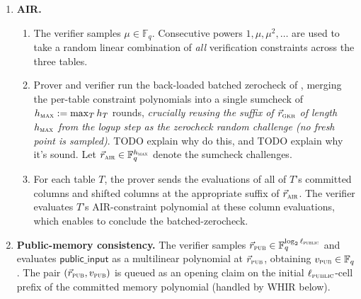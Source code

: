 \documentclass{article}
\theoremstyle{definition}
\newcommand{\Fq}{\mathbb F_q}
\begin{document}
\begin{enumerate}
\begin{enumerate}
         \item The prover sends, at the appropriate suffixes of $\vec r_\textsc{gkr}$:
    \begin{itemize}
        \item the evaluations of $\textsf{memory\_acc}$ and $\textbf{m}$ for the memory section;
        \item the evaluation of $\textsf{bytecode\_acc}$ for the bytecode section;
        \item for each table $T$ and each bus interaction of $T$, the per-column evaluations needed to reconstruct that bus's numerator/denominator contribution.
    \end{itemize}
    The verifier recombines these evaluations into a claimed total numerator and denominator and checks they equal $(e_\text{num}, e_\text{den})$.
    \end{enumerate}

    \item \textbf{AIR.}
    \begin{enumerate}
        \item The verifier samples $\mu \in \Fq$. Consecutive powers $1, \mu, \mu^2, \dots$ are used to take a random linear combination of \emph{all} verification constraints across the three tables.
        \item Prover and verifier run the back-loaded batched zerocheck of , merging the per-table constraint polynomials into a single sumcheck of $h_\textsc{max} := \max_T h_T$ rounds, \emph{crucially reusing the suffix of $\vec r_\textsc{gkr}$ of length $h_\textsc{max}$ from the logup step as the zerocheck random challenge (no fresh point is sampled)}. TODO explain why do this, and TODO explain why it's sound. Let $\vec r_\textsc{air} \in \Fq^{h_\textsc{max}}$ denote the sumcheck challenges.
        \item For each table $T$, the prover sends the evaluations of all of $T$'s committed columns and shifted columns at the appropriate suffix of $\vec r_\textsc{air}$. The verifier evaluates $T$'s AIR-constraint polynomial at these column evaluations, which enables to conclude the batched-zerocheck.
    \end{enumerate}

    \item \textbf{Public-memory consistency.} The verifier samples $\vec r_\textsc{pub} \in \Fq^{\log_2 \ell_\textsc{public}}$ and evaluates $\textsf{public\_input}$ as a multilinear polynomial at $\vec r_\textsc{pub}$, obtaining $v_\textsc{pub} \in \Fq$. The pair $(\vec r_\textsc{pub}, v_\textsc{pub})$ is queued as an opening claim on the initial $\ell_\textsc{public}$-cell prefix of the committed memory polynomial (handled by WHIR below).


\end{enumerate}
\end{document}
